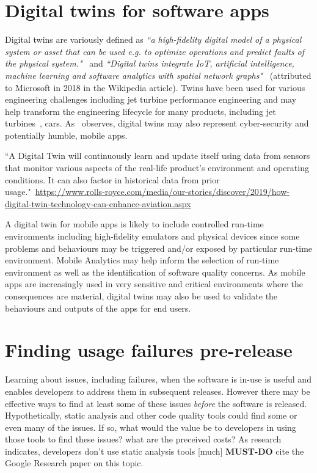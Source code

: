 \section{Digital twins for software apps}
Digital twins are variously defined as \emph{``a high-fidelity digital model of a physical system or asset that can be used e.g. to optimize operations and predict faults of the physical system."}~\citep{pokhrel2020_digitaltwin_for_cybersecurity} and \emph{``Digital twins integrate IoT, artificial intelligence, machine learning and software analytics with spatial network graphs"}~\citep{wikipedia__digital_twin} (attributed to Microsoft in 2018 in the Wikipedia article). Twins have been used for various engineering challenges including jet turbine performance engineering and may help transform the engineering lifecycle for many products, including jet turbines~\citep{read2018_digital_takeover_avionics}, cars. As~\citep{pokhrel2020_digitaltwin_for_cybersecurity} observes, digital twins may also represent cyber-security and potentially humble, mobile apps.

``A Digital Twin will continuously learn and update itself using data from sensors that monitor various aspects of the real-life product’s environment and operating conditions. It can also factor in historical data from prior usage."~\url{https://www.rolls-royce.com/media/our-stories/discover/2019/how-digital-twin-technology-can-enhance-aviation.aspx}

A digital twin for mobile apps is likely to include controlled run-time environments including high-fidelity emulators and physical devices since some problems and behaviours may be triggered and/or exposed by particular run-time environment. Mobile Analytics may help inform the selection of run-time environment as well as the identification of software quality concerns. As mobile apps are increasingly used in very sensitive and critical environments where the consequences are material, digital twins may also be used to validate the behaviours and outputs of the apps for end users.



\section{Finding usage failures pre-release}
Learning about issues, including failures, when the software is in-use is useful and enables developers to address them in subsequent releases. However there may be effective ways to find at least some of these issues \textit{before} the software is released. Hypothetically, static analysis and other code quality tools could find some or even many of the issues. If so, what would the value be to developers in using those tools to find these issues? what are the preceived costs? As research indicates, developers don't use static analysis tools [much] 
\textbf{MUST-DO} cite the Google Research paper on this topic.

